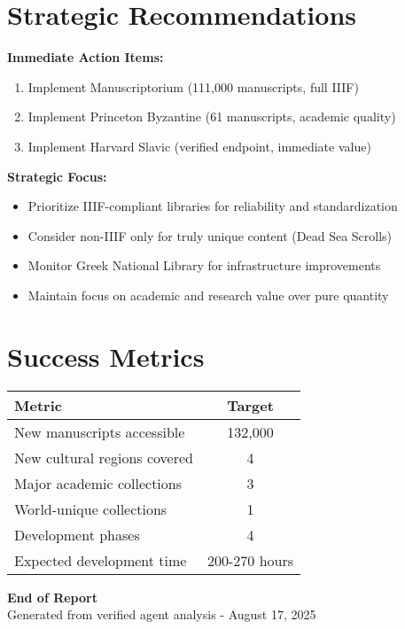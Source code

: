 \documentclass[11pt,a4paper]{article}
\begin{document}
\section{Strategic Recommendations}

\begin{successbox}
\textbf{Immediate Action Items:}
\begin{enumerate}
    \item Implement Manuscriptorium (111,000 manuscripts, full IIIF)
    \item Implement Princeton Byzantine (61 manuscripts, academic quality)
    \item Implement Harvard Slavic (verified endpoint, immediate value)
\end{enumerate}
\end{successbox}

\begin{infobox}
\textbf{Strategic Focus:}
\begin{itemize}[leftmargin=*,noitemsep]
    \item Prioritize IIIF-compliant libraries for reliability and standardization
    \item Consider non-IIIF only for truly unique content (Dead Sea Scrolls)
    \item Monitor Greek National Library for infrastructure improvements
    \item Maintain focus on academic and research value over pure quantity
\end{itemize}
\end{infobox}

\section{Success Metrics}

\begin{center}
\begin{tabular}{lc}
\toprule
\textbf{Metric} & \textbf{Target} \\
\midrule
New manuscripts accessible & 132,000 \\
New cultural regions covered & 4 \\
Major academic collections & 3 \\
World-unique collections & 1 \\
Development phases & 4 \\
Expected development time & 200-270 hours \\
\bottomrule
\end{tabular}
\end{center}

\vfill

\begin{center}
\textcolor{primary}{\large\textbf{End of Report}}\\
\textcolor{gray600}{\footnotesize Generated from verified agent analysis - August 17, 2025}
\end{center}
\end{document}
